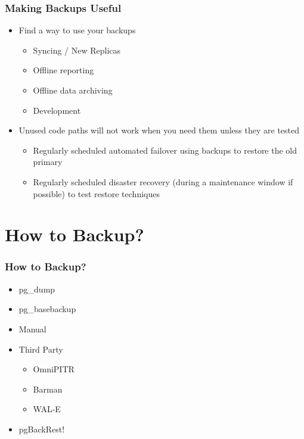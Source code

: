 \documentclass[hyperref={pdfpagelabels=false}]{beamer}
\begin{document}
    \begin{frame}
        \frametitle{Making Backups Useful}

        \begin{itemize}
            \item Find a way to use your backups

            \begin{itemize}
                \item Syncing / New Replicas
                \item Offline reporting
                \item Offline data archiving
                \item Development
            \end{itemize}

            \item Unused code paths will not work when you need them unless they are tested

            \begin{itemize}
                \item Regularly scheduled automated failover using backups to restore the old primary
                \item Regularly scheduled disaster recovery (during a maintenance window if possible) to test restore techniques
            \end{itemize}
        \end{itemize}
    \end{frame}

    \section{How to Backup?}

    \begin{frame}
        \frametitle{How to Backup?}

        \begin{itemize}
            \item pg\_dump

            \item pg\_basebackup

            \item Manual

            \item Third Party

            \begin{itemize}
                \item OmniPITR
                \item Barman
                \item WAL-E
            \end{itemize}

            \item pgBackRest!
        \end{itemize}
    \end{frame}
\end{document}
